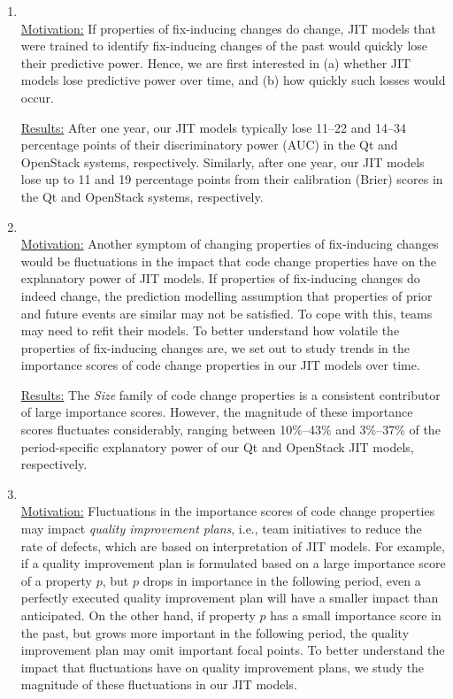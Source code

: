\begin{enumerate}[{\bf (RQ1)}]
\item {\bf \rqi}\\
  \underline{Motivation:}
    If properties of fix-inducing changes do change, JIT models that were trained to identify fix-inducing changes of the past would quickly lose their predictive power.
Hence, we are first interested in (a) whether JIT models lose predictive power over time, and (b) how quickly such losses would occur.

  \underline{Results:}
  After one year, our JIT models typically lose 11--22 and 14--34 percentage points of their discriminatory power (AUC) in the {\sc Qt} and {\sc OpenStack} systems, respectively.
  Similarly, after one year, our JIT models lose up to 11 and 19 percentage points from their calibration (Brier) scores in the {\sc Qt} and {\sc OpenStack} systems, respectively.
  \newpage
\item {\bf \rqii}\\
  \underline{Motivation:}
 Another symptom of changing properties of fix-inducing changes would be fluctuations in the impact that code change properties have on the explanatory power of JIT models.
 If properties of fix-inducing changes do indeed change, the prediction modelling assumption that properties of prior and future events are similar may not be satisfied.
  To cope with this, teams may need to refit their models.
  To better understand how volatile the properties of fix-inducing changes are, we set out to study trends in the importance scores of code change properties in our JIT models over time. 

  \underline{Results:}
  The {\em Size} family of code change properties is a consistent contributor of large importance scores.
  However, the magnitude of these importance scores fluctuates considerably, ranging between 10\%--43\% and 3\%--37\% of the period-specific explanatory power of our {\sc Qt} and {\sc OpenStack} JIT models, respectively.
\item {\bf \rqiii}\\
  \underline{Motivation:}
  Fluctuations in the importance scores of code change properties may impact {\em quality improvement plans}, i.e., team initiatives to reduce the rate of defects, which are based on interpretation of JIT models.
  For example, if a quality improvement plan is formulated based on a large importance score of a property $p$, but $p$ drops in importance in the following period, even a perfectly executed quality improvement plan will have a smaller impact than anticipated.
  On the other hand, if property $p$ has a small importance score in the past, but grows more important in the following period, the quality improvement plan may omit important focal points.
  To better understand the impact that fluctuations have on quality improvement plans, we study the magnitude of these fluctuations in our JIT models.


\end{enumerate}
